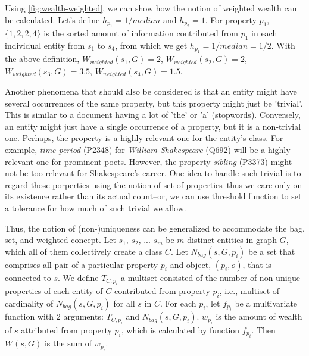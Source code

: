 Using \autoref{fig:wealth-weighted}, we can show how the notion of weighted wealth can be calculated. Let's define \(h_{p_1} = 1/median\) and \(h_{p_2} = 1\). For property \(p_1\), \(\{1, 2, 2, 4\}\) is the sorted amount of information contributed from \(p_1\) in each individual entity from \(s_1\) to \(s_4\), from which we get \(h_{p_1} = 1/median = 1/2\). With the above definition, \(W_{weighted}(s_1, G) = 2\), \(W_{weighted}(s_2, G) = 2\), \(W_{weighted}(s_3, G) = 3.5\), \(W_{weighted}(s_4, G) = 1.5\).

Another phenomena that should also be considered is that an entity might have several occurrences of the same property, but this property might just be 'trivial'. This is similar to a document having a lot of 'the' or 'a' (stopwords). Conversely, an entity might just have a single occurrence of a property, but it is a non-trivial one. Perhaps, the property is a highly relevant one for the entity's class. For example, \textit{time period} (P2348) for \textit{William Shakespeare} (Q692) will be a highly relevant one for prominent poets. However, the property \textit{sibling} (P3373) might not be too relevant for Shakespeare's career. One idea to handle such trivial is to regard those porperties using the notion of set of properties--thus we care only on its existence rather than its actual count--or, we can use threshold function to set a tolerance for how much of such trivial we allow.



Thus, the notion of (non-)uniqueness can be generalized to accommodate the bag, set, and weighted concept. Let \(s_1\), \(s_2\), ... \(s_m\) be \(m\) distinct entities in graph \(G\), which all of them collectively create a class \(C\). Let \(N_{bag}(s,G,p_i)\) be a set that comprises all pair of a particular property \(p_i\) and object, \((p_i,o)\), that is connected to \(s\). We define \(T_{C,p_i}\) a multiset consisted of the number of non-unique properties of each entity of \(C\) contributed from property \(p_i\), i.e., multiset of cardinality of \(N_{bag}(s,G,p_i)\) for all \(s\) in \(C\). For each \(p_i\), let \(f_{p_i}\) be a multivariate function with 2 arguments: \(T_{C,p_i}\) and \(N_{bag}(s,G,p_i)\). \(w_{p_i}\) is the amount of wealth of \(s\) attributed from property \(p_i\), which is calculated by function \(f_{p_i}\). Then \(W_{}(s, G)\) is the sum of \(w_{p_i}\).


